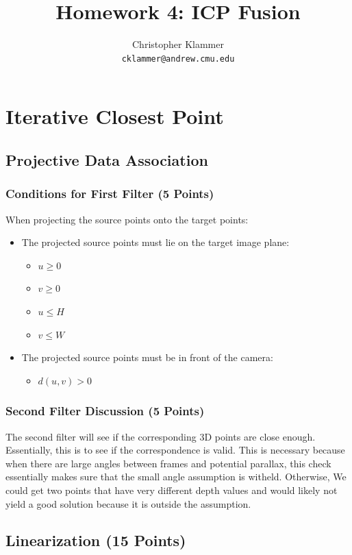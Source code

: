 \documentclass[12pt, a4paper]{article}
\title{Homework 4: ICP Fusion}
\author{Christopher Klammer \\ \small\texttt{cklammer@andrew.cmu.edu}}
\begin{document}
\maketitle

\section{Iterative Closest Point}
\subsection{Projective Data Association}
\subsubsection{Conditions for First Filter (5 Points)}
When projecting the source points onto the target points:
\begin{itemize}
    \item The projected source points must lie on the target image plane:
    
    \begin{itemize}
        \item $u \geq 0$
        \item $v \geq 0$
        \item $u \le H$
        \item $v \le W$
    \end{itemize}

    \item The projected source points must be in front of the camera:
    \begin{itemize}
        \item $d(u,v) > 0$
    \end{itemize}
\end{itemize}
\subsubsection{Second Filter Discussion (5 Points)}
The second filter will see if the corresponding 3D points are close enough. Essentially, this is to see if the correspondence is valid. This is necessary because when there are large angles between frames and potential parallax, this check essentially makes sure that the small angle assumption is witheld. Otherwise, We could get two points that have very different depth values and would likely not yield a good solution because it is outside the assumption.
\subsection{Linearization (15 Points)}
\end{document}
